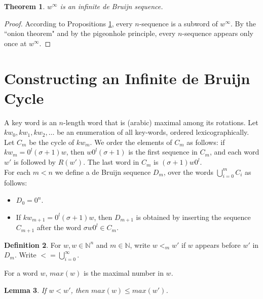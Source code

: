 \documentclass{article}
\newtheorem{theorem}{Theorem}
\newtheorem{lemma}[theorem]{Lemma}
\theoremstyle{definition}
\newtheorem{definition}[theorem]{Definition}
\newcommand{\N}{{\mathbb{N}}}
\begin{document}
\begin{theorem}
	$w^\infty$ is an infinite de Bruijn sequence.
\end{theorem}

\begin{proof}
	According to Propositions \ref{}, every $n$-sequence is a subword of $w^\infty$. By the ``onion theorem" and by the pigeonhole principle, every $n$-sequence appears only once at $w^\infty$.
\end{proof}


\section{Constructing an Infinite de Bruijn Cycle}

A key word is an $n$-length word that is (arabic) maximal among its rotations. Let $kw_0,kw_1,kw_2,\dots$ be an enumeration of all key-words, ordered lexicographically. Let $C_m$ be the cycle of $kw_m$. We order the elements of $C_m$ as follows:  if $kw_m=0^l(\sigma+1)w$, then $w0^l(\sigma+1)$ is the first sequence in $C_m$, and each word $w'$ is followed by $R(w')$. The last word in $C_m$ is $(\sigma+1)w0^l$.\\

For each $m<n$ we define a de Bruijn sequence $D_m$, over the words $\bigcup_{i=0}^m C_i$ as follows: 
\begin{itemize}
	\item $D_0=0^n$.
	\item If $kw_{m+1}=0^l(\sigma+1)w$, then $D_{m+1}$ is obtained by inserting the sequence $C_{m+1}$ after the word $\sigma w 0^l\in C_m$.
\end{itemize}


\begin{definition}
	For $w,w\in \N^n$ and $m\in \N$, write $w<_m w'$ if $w$ appears before $w'$ in $D_m$. Write $<=\bigcup_{i=0}^\infty$.
\end{definition}

For a word $w$, $max(w)$ is the maximal number in $w$.

\begin{lemma}
	If $w<w'$, then $max(w)\leq max(w')$.
\end{lemma}
\end{document}
